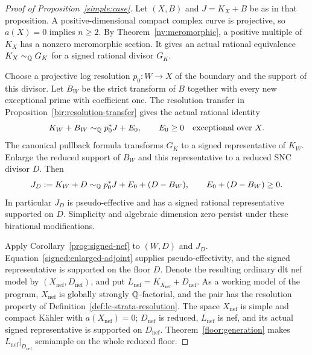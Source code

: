 \begin{proof}[Proof of Proposition~\ref{simple:case}]
Let \((X,B)\) and \(J=K_X+B\) be as in that proposition.
A positive-dimensional compact complex curve is projective,
so \(a(X)=0\) implies \(n\geq2\).  By
Theorem~\ref{nv:meromorphic}, a positive multiple of
\(K_X\) has a nonzero meromorphic section.  It gives an
actual rational equivalence \(K_X\sim_{\mathbb Q}G_K\) for a
signed rational divisor \(G_K\).

Choose a projective log resolution \(p_0:W\to X\) of the
boundary and the support of this divisor.  Let \(B_W\) be
the strict transform of \(B\) together with every new
exceptional prime with coefficient one.  The resolution transfer in
Proposition~\ref{bir:resolution-transfer}
gives the actual rational identity
\[
 K_W+B_W\sim_{\mathbb Q}p_0^*J+E_0,
 \qquad E_0\geq0\quad\text{exceptional over }X.
\]
The canonical pullback formula transforms \(G_K\) to a
signed representative of \(K_W\).  Enlarge the reduced
support of \(B_W\) and this representative to a reduced
SNC divisor \(D\).  Then
\begin{equation}\label{signed:enlarged-adjoint}
 J_D:=K_W+D\sim_{\mathbb Q}p_0^*J+E_0+(D-B_W),
 \qquad E_0+(D-B_W)\geq0.
\end{equation}
In particular \(J_D\) is pseudo-effective and has a
signed rational representative supported on \(D\).
Simplicity and algebraic dimension zero persist under these
birational modifications.

Apply Corollary~\ref{prog:signed-nef} to \((W,D)\) and \(J_D\).
Equation~\eqref{signed:enlarged-adjoint} supplies pseudo-effectivity, and
the signed representative is supported on the floor \(D\).
Denote the resulting ordinary dlt nef model by
\((X_{\mathrm{nef}},D_{\mathrm{nef}})\), and put
\(L_{\mathrm{nef}}=K_{X_{\mathrm{nef}}}+D_{\mathrm{nef}}\).
As a working model of the program, \(X_{\mathrm{nef}}\) is globally
strongly \(\mathbb Q\)-factorial, and the pair has the resolution property of
Definition~\ref{def:lc-strata-resolution}.  The space \(X_{\mathrm{nef}}\)
is simple and compact Kähler with \(a(X_{\mathrm{nef}})=0\);
\(D_{\mathrm{nef}}\) is reduced, \(L_{\mathrm{nef}}\) is nef, and its
actual signed representative is supported on \(D_{\mathrm{nef}}\).
Theorem~\ref{floor:generation} makes
\(L_{\mathrm{nef}}|_{D_{\mathrm{nef}}}\)
semiample on the whole reduced floor.


\end{proof}
